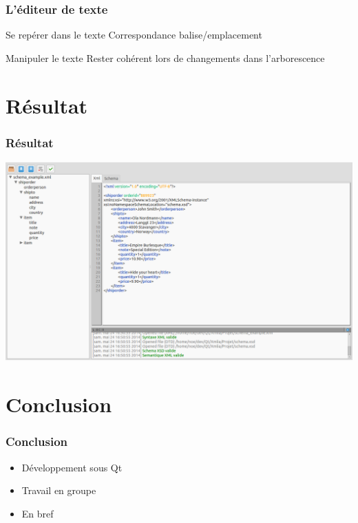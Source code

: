 \documentclass{beamer}
\begin{document}
        \begin{frame}
          \frametitle{L'éditeur de texte}
          \begin{block}{Se repérer dans le texte}
            Correspondance balise/emplacement
          \end{block}
          \pause
          \begin{block}{Manipuler le texte}
            Rester cohérent lors de changements dans l'arborescence
          \end{block}
        \end{frame}
          
	\section{Résultat}

	\begin{frame}
		\frametitle{Résultat}
		\includegraphics[scale=0.2]{images/final.png}
	\end{frame}


	\section{Conclusion}

	\begin{frame}
		\frametitle{Conclusion}
		\begin{itemize}
			\item Développement sous Qt
			\item Travail en groupe
			\item En bref
		\end{itemize}
	\end{frame}
\end{document}
